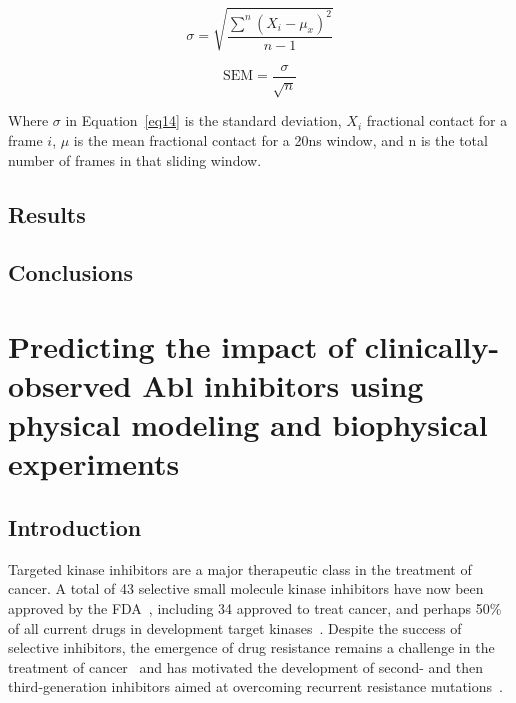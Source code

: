 \documentclass[phd,tocprelim]{cornell}
\begin{document}
\begin{equation}\label{eq14}
\sigma = \sqrt{\frac{ \sum^n (X_i - \mu_x)^2}{n-1}}
\end{equation}

\begin{equation}\label{eq15}
\text{SEM} = \frac{\sigma}{\sqrt{n}}
\end{equation}

Where $\sigma$ in Equation~\ref{eq14} is the standard deviation, $X_i$ fractional contact for a frame $i$, $\mu$ is the mean fractional contact for a 20ns window, and n is the total number of frames in that sliding window. 

\section{Results}




\section{Conclusions}

\chapter{Predicting the impact of clinically-observed Abl inhibitors using physical modeling and biophysical experiments}
\section{Introduction}
Targeted kinase inhibitors are a major therapeutic class in the treatment of cancer.
A total of 43 selective small molecule kinase inhibitors have now been approved by the FDA~\citep{fda-approved-kinase-inhibitors}, including 34 approved to treat cancer, and perhaps 50\% of all current drugs in development target kinases~\citep{Santos:Nat.Rev.DrugDiscov.:2016}.
  Despite the success of selective inhibitors, the emergence of drug resistance remains a challenge in the treatment of cancer~\citep{Shah:CancerCell:2002,BUCZEK201431,huang2015mechanisms,Meyer2051,Davare29092015,VanAllen94,Rani3821,Holohan:Nat.Rev.Cancer:2013} and has motivated the development of second- and then third-generation inhibitors aimed at overcoming recurrent resistance mutations~\citep{Weisberg:Nat.Rev.Cancer:2007,Y.Lu:Curr.Med.Chem.:2011,Juchum:DrugResist.Updat.:2015,Song:ActaPharm.Sin.B:2015,Neel:NpjPrecis.Oncol.:2017}.   
\end{document}
